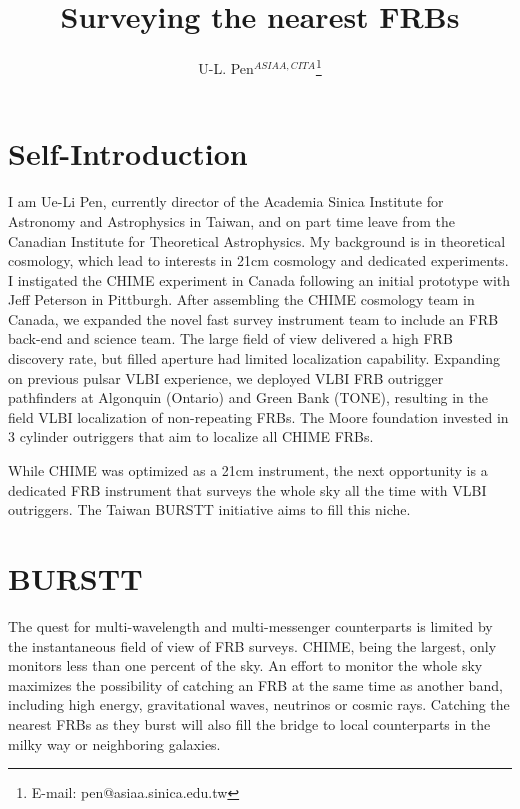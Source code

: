 \documentclass[fleqn,usenatbib]{mnras}
\title[nearby FRBs]{Surveying the nearest FRBs}
\author[ U-L. Pen]{
U-L. Pen$^{ASIAA,CITA}$\thanks{E-mail: pen@asiaa.sinica.edu.tw   }
}
\begin{document}
\label{firstpage}
\pagerange{\pageref{firstpage}--\pageref{lastpage}}
\maketitle

\section{Self-Introduction}

I am Ue-Li Pen, currently director of the Academia Sinica Institute for Astronomy and Astrophysics in Taiwan, and on part time leave from the Canadian Institute for Theoretical Astrophysics.  My background is in theoretical cosmology, which lead to interests in 21cm cosmology and dedicated experiments.  I instigated the CHIME experiment in Canada following an initial prototype with Jeff Peterson in Pittburgh. After assembling the CHIME cosmology team in Canada, we expanded the novel fast survey instrument team to include an FRB back-end and science team.  The large field of view delivered a high FRB discovery rate, but filled aperture had limited localization capability.  Expanding on previous pulsar VLBI experience, we deployed VLBI FRB outrigger pathfinders at Algonquin (Ontario) and Green Bank (TONE), resulting in the field VLBI localization of non-repeating FRBs.  The Moore foundation invested in 3 cylinder outriggers that aim to localize all CHIME FRBs.

While CHIME was optimized as a 21cm instrument, the next opportunity is a dedicated FRB instrument that surveys the whole sky all the time with VLBI outriggers.  The Taiwan BURSTT initiative aims to fill this niche.

\section{BURSTT}

The quest for multi-wavelength and multi-messenger counterparts is limited by the instantaneous field of view of FRB surveys.  CHIME, being the largest, only monitors less than one percent of the sky.  An effort to monitor the whole sky maximizes the possibility of catching an FRB at the same time as another band, including high energy, gravitational waves, neutrinos or cosmic rays.  Catching the nearest FRBs as they burst will also fill the bridge to local counterparts in the milky way or neighboring galaxies.
\end{document}
